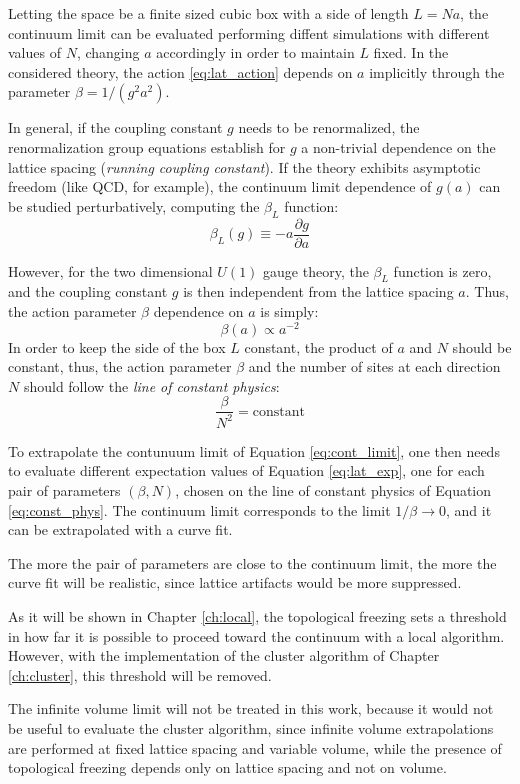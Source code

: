Letting the space be a finite sized cubic box with a side of length $L=Na$,
the continuum limit can be evaluated performing diffent simulations with different values of $N$, changing $a$ accordingly in order to maintain $L$ fixed.
In the considered theory, the action \eqref{eq:lat_action} depends on $a$ implicitly through the parameter $\beta = 1/(g^2a^2)$.

In general, if the coupling constant $g$ needs to be renormalized,
the renormalization group equations establish for $g$ a non-trivial dependence on the lattice spacing (\emph{running coupling constant}).
If the theory exhibits asymptotic freedom (like QCD, for example), the continuum limit dependence of $g(a)$ can be studied perturbatively, computing the $\beta_L$ function:
\[
    \beta_L(g) \equiv -a\frac{\partial g}{\partial a}
\]

However, for the two dimensional $U(1)$ gauge theory, the $\beta_L$ function is zero, and the coupling constant $g$ is then independent from the lattice spacing $a$.
Thus, the action parameter $\beta$ dependence on $a$ is simply:
\[
    \beta(a) \propto a^{-2}
\]
In order to keep the side of the box $L$ constant, the product of $a$ and $N$ should be constant,
thus, the action parameter $\beta$ and the number of sites at each direction $N$ should follow the \emph{line of constant physics}:
\begin{equation}\label{eq:const_phys}
    \frac{\beta}{N^2} = \text{constant}
\end{equation}

To extrapolate the contunuum limit of Equation \eqref{eq:cont_limit},
one then needs to evaluate different expectation values of Equation \eqref{eq:lat_exp},
one for each pair of parameters $(\beta,N)$, chosen on the line of constant physics of Equation \eqref{eq:const_phys}.
The continuum limit corresponds to the limit $1/\beta\to0$, and it can be extrapolated with a curve fit.

The more the pair of parameters are close to the continuum limit, the more the curve fit will be realistic,
since lattice artifacts would be more suppressed. 

As it will be shown in Chapter \ref{ch:local}, the topological freezing sets a threshold in how far it is possible to proceed toward the continuum with a local algorithm.
However, with the implementation of the cluster algorithm of Chapter \ref{ch:cluster}, this threshold will be removed.

The infinite volume limit will not be treated in this work,
because it would not be useful to evaluate the cluster algorithm,
since infinite volume extrapolations are performed at fixed lattice spacing and variable volume,
while the presence of topological freezing depends only on lattice spacing and not on volume.

